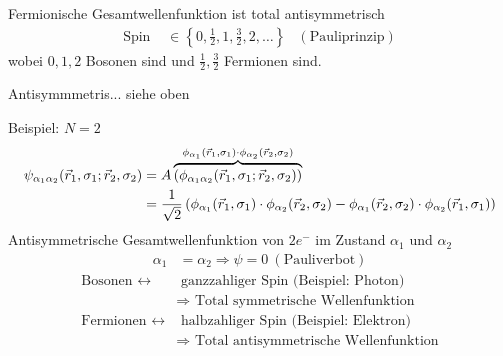 	Fermionische Gesamtwellenfunktion ist total antisymmetrisch
		\begin{align*}
			\text{Spin } &\in \left\{ 0, \frac{1}{2}, 1 , \frac{3}{2}, 2 , \ldots \right\} 
			& (\text{Pauliprinzip})
		\end{align*}
	wobei $0, 1 , 2$ Bosonen sind und $\frac{1}{2}, \frac{3}{2}$ Fermionen sind.
	
	Antisymmmetris... siehe oben
	
	Beispiel: $N = 2$
		\begin{align*}
			\psi_{\alpha_1 \alpha_2} (\vec{r}_1, \sigma_1; \vec{r}_2, \sigma_2)
			&= A \overbrace{(\phi_{\alpha_1 \alpha_2} (\vec{r}_1, \sigma_1; \vec{r}_2, \sigma_2))}^{\mathclap{\phi_{\alpha_1} (\vec{r}_1, \sigma_1) \cdot \phi_{\alpha_2}(\vec{r}_2, \sigma_2)}} \\
			&= \frac{1}{\sqrt{2}}
			\left(\phi_{\alpha_1} (\vec{r}_1, \sigma_1) \cdot \phi_{\alpha_2}(\vec{r}_2, \sigma_2)
			- \phi_{\alpha_1} (\vec{r}_2, \sigma_2) \cdot \phi_{\alpha_2}(\vec{r}_1, \sigma_1)\right)
		\end{align*}
	Antisymmetrische Gesamtwellenfunktion von $2 e^-$ im Zustand $\alpha_1$ und $\alpha_2$ 
		\begin{align*}
			\alpha_1 &= \alpha_2 \Rightarrow \psi = 0 ~(\text{Pauliverbot})
		\end{align*}
		\begin{align*}
			\text{Bosonen } \longleftrightarrow& 
			\text{ ganzzahliger Spin (Beispiel: Photon)} \\
			&\Rightarrow \text{ Total symmetrische Wellenfunktion}\\
			\text{Fermionen } \longleftrightarrow& 
			\text{ halbzahliger Spin (Beispiel: Elektron)} \\
			&\Rightarrow \text{ Total antisymmetrische Wellenfunktion}
		\end{align*}
